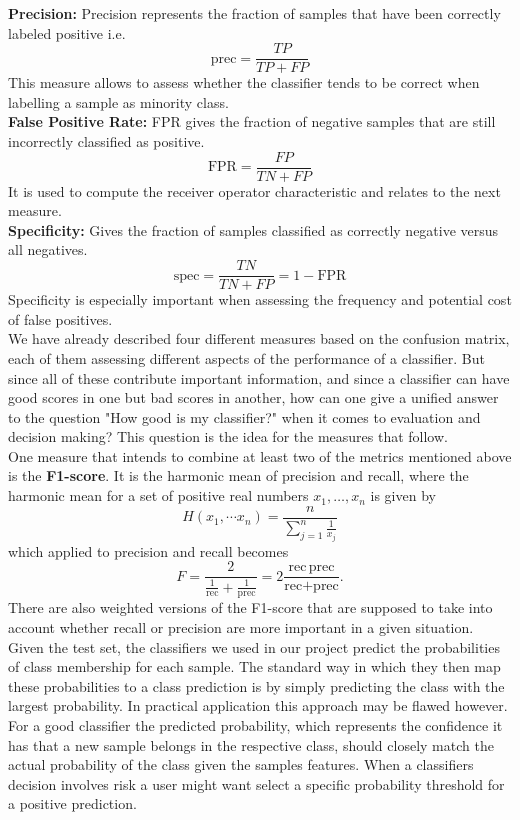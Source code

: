 \textbf{Precision:}
Precision represents the fraction of samples that have been correctly labeled positive i.e.
\[
	\text{prec} = \frac{TP}{TP + FP}
\]
This measure allows to assess whether the classifier tends to be correct when labelling a sample as minority class.\\

\textbf{False Positive Rate:}
FPR gives the fraction of negative samples that are still incorrectly classified as positive.
\[
	\text{FPR} = \frac{FP}{TN + FP}
\]
It is used to compute the receiver operator characteristic and relates to the next measure.\\

\textbf{Specificity:}
Gives the fraction of samples classified as correctly negative versus all negatives.
\[
	\text{spec} = \frac{TN}{TN + FP} = 1 - \text{FPR}
\]
Specificity is especially important when assessing the frequency and potential cost of false positives.\\


We have already described four different measures based on the confusion matrix, each of them assessing different aspects of the performance of a classifier.
But since all of these contribute important information, and since a classifier can have good scores in one but bad scores in another, 
how can one give a unified answer to the question "How good is my classifier?" when it comes to evaluation and decision making?
This question is the idea for the measures that follow.\\

One measure that intends to combine at least two of the metrics mentioned above is the \textbf{F1-score}.
It is the harmonic mean of precision and recall, where the harmonic mean for a set of positive real numbers $x_1, \dots, x_n$ is given by
\[
	H(x_1, \dotsm x_n) = \frac{n}{\sum_{j=1}^n \frac{1}{x_j}}
\]
which applied to precision and recall becomes
\[
	F = \frac{2}{ \frac{1}{\text{rec}} + \frac{1}{\text{prec}} } = 2 \frac{\text{rec} \, \text{prec}}{ \text{rec} + \text{prec} }.
\]
There are also weighted versions of the F1-score that are supposed to take into account whether recall or precision are more important in a given situation.\\

Given the test set, the classifiers we used in our project predict the probabilities of class membership for each sample.
The standard way in which they then map these probabilities to a class prediction is by simply predicting the class with the largest probability.
In practical application this approach may be flawed however. 
For a good classifier the predicted probability, which represents the confidence it has that a new sample belongs in the respective class, 
should closely match the actual probability of the class given the samples features. 
When a classifiers decision involves risk a user might want select a specific probability threshold for a positive prediction. \\

